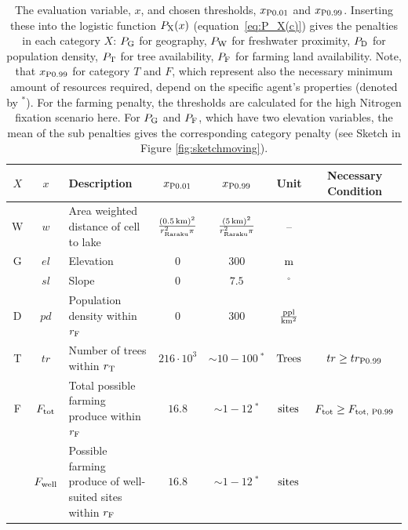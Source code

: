  \begin{table}
 	
	\centering
	\caption{The evaluation variable, $x$, and chosen thresholds, $x_{\rm P0.01}$ and $x_{\rm P0.99}$. %
		Inserting these into the logistic function $P_{\rm X}(x)$ (equation~\ref{eq:P_X(c)}) gives the penalties in each category $X$:
		$P_{\rm G}$ for geography, $P_{\rm W}$ for freshwater proximity, $P_{\rm D}$ for population density, $P_{\rm T}$ for tree availability, $P_{\rm F}$ for farming land availability.
		Note, that $x_{\rm P0.99}$ for category $T$ and $F$, which represent also the necessary minimum amount of resources required, depend on the specific agent's properties (denoted by $^*$).
		For the farming penalty, the thresholds are calculated for the high Nitrogen fixation scenario here.
		For $P_{\rm G}$ and $P_{\rm F}$, which have two elevation variables, the mean of the sub penalties gives the corresponding category penalty (see Sketch in Figure \ref{fig:sketchmoving}).}
	\begin{tabular}{c|c|L|c|c|c|S}
		$X$ & $x$& Description & $x_{\rm P0.01}$ & $x_{\rm P0.99}$ & Unit & Necessary Condition \\ \hline
		W &$w$ & Area weighted distance of cell to lake & $\frac{(0.5\, {\rm km})^2}{r_\text{Raraku}^2\pi}$ & $\frac{(5\, {\rm km})^2}{r_\text{Raraku}^2\pi}$& -- & \\
		G & $el$ & Elevation & $0$ & $300$ & $ {\rm m}$ & \\
		& $sl$ & Slope & $0$ & $7.5$ & $^\circ$ &  \\
		D & $pd$ & Population density within $r_{\rm F}$ & $0$ & $300$ & ${\rm \frac{ppl}{km^2}}$ &  \\
		T & $tr$ & Number of trees within $r_{\rm T}$ & $216\cdot 10^3$ & $\sim 10-100\ ^*$ & $ {\rm Trees}$ &  $tr \geq tr_{\rm P0.99}$\\
		F& $F_{\rm tot}$ & Total possible farming produce within $r_{\rm F}$ & $16.8$  & $\sim 1-12 \ ^*$& $ \rm{sites}$ &  $F_{\rm tot} \geq F_\text{tot, P0.99}$\\
		& $F_{\rm well}$ & Possible farming produce of well-suited sites within $r_{\rm F}$ & $16.8$  & $\sim 1-12 \ ^*$& $ \rm{sites}$ &  \\
	\end{tabular}
\label{tab:x01x09} 
\end{table}


